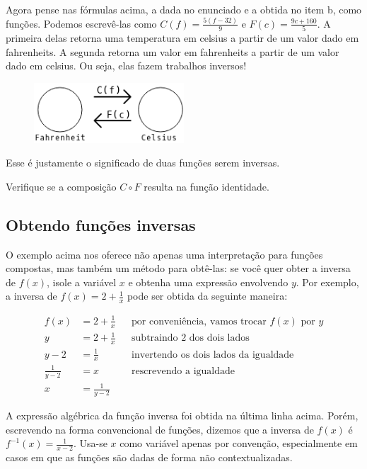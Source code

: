 \documentclass[main_estudante.tex]{subfiles}
\begin{document}
Agora pense nas fórmulas acima, a dada no enunciado e a obtida no item b, como funções. Podemos escrevê-las como $C(f)=\frac{5(f-32)}{9}$ e $F(c)=\frac{9c+160}{5}$. A primeira delas retorna uma temperatura em celsius a partir de um valor dado em fahrenheits. A segunda retorna um valor em fahrenheits a partir de um valor dado em celsius. Ou seja, elas fazem trabalhos inversos!

\begin{figure}[h]
\centering
\includegraphics[width=0.5\textwidth]{./img/c5q9.png}
\end{figure}

Esse é justamente o significado de duas funções serem inversas. 

\begin{questao}
Verifique se a composição $C \circ F$ resulta na função identidade.
\end{questao}

\subsection*{Obtendo funções inversas} %

O exemplo acima nos oferece não apenas uma interpretação para funções compostas, mas também um método para obtê-las: se você quer obter a inversa de $f(x)$, isole a variável $x$ e obtenha uma expressão envolvendo $y$. Por exemplo, a inversa de $f(x)=2+\frac{1}{x}$ pode ser obtida da seguinte maneira:

\begin{align*}
 f(x) &=2+\frac{1}{x} && \text{por conveniência, vamos trocar } f(x) \text{ por } y \\
 y &= 2+\frac{1}{x} && \text{subtraindo 2 dos dois lados}\\ 
 y-2 &= \frac{1}{x}  && \text{invertendo os dois lados da igualdade}\\
 \frac{1}{y-2} &= x && \text{rescrevendo a igualdade}\\
 x &= \frac{1}{y-2}
\end{align*}

A expressão algébrica da função inversa foi obtida na última linha acima. Porém, escrevendo na forma convencional de funções, dizemos que a inversa de $f(x)$ é $f^{-1}(x)=\frac{1}{x-2}$. Usa-se $x$ como variável apenas por convenção, especialmente em casos em que as funções são dadas de forma não contextualizadas.
\end{document}
